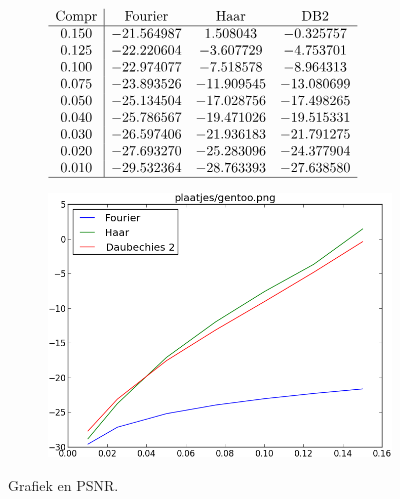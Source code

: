 \begin{figure}
  \centering
  \begin{subfigure}[t]{0.48\textwidth}
    \centering
    \vspace{10pt}
    \begingroup

    \renewcommand*{\arraystretch}{1.5}
    $\begin{array}{c | c c c c}
      \text{Compr} & \text{Fourier} & \text{Haar} & \text{DB2} \\ \hline
      0.150 & -21.564987 & 1.508043 & -0.325757 \\
      0.125 & -22.220604 & -3.607729 & -4.753701 \\
      0.100 & -22.974077 & -7.518578 & -8.964313 \\
      0.075 & -23.893526 & -11.909545 & -13.080699 \\
      0.050 & -25.134504 & -17.028756 & -17.498265 \\
      0.040 & -25.786567 & -19.471026 & -19.515331 \\
      0.030 & -26.597406 & -21.936183 & -21.791275 \\
      0.020 & -27.693270 & -25.283096 & -24.377904 \\
      0.010 & -29.532364 & -28.763393 & -27.638580 \\ \hline
    \end{array}$
    \endgroup
  \end{subfigure}
  \begin{subfigure}[t]{0.48\textwidth}
    \centering
    \vspace{0pt}
    \includegraphics[height=\textwidth]{plaatjes/grafiek_gentoo_0_15-0_01.png}
  \end{subfigure}
  \caption{Grafiek en PSNR.}
\end{figure}
\restoregeometry
\pagebreak


